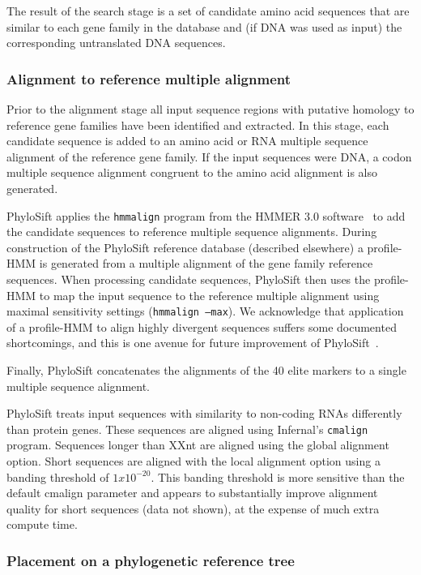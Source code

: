 \documentclass[10pt]{article}
\begin{document}
The result of the search stage is a set of candidate amino acid sequences that are similar to each gene family in the database and (if {DNA} was used as input) the corresponding untranslated {DNA} sequences.

\subsubsection*{Alignment to reference multiple alignment}
Prior to the alignment stage all input sequence regions with putative homology to reference gene families have been identified and extracted.
In this stage, each candidate sequence is added to an amino acid or {RNA} multiple sequence alignment of the reference gene family.
If the input sequences were {DNA}, a codon multiple sequence alignment congruent to the amino acid alignment is also generated.

PhyloSift applies the \texttt{hmmalign} program from the HMMER 3.0 software~\cite{Eddy2011} to add the candidate sequences to reference multiple sequence alignments.
During construction of the PhyloSift reference database (described elsewhere) a profile-HMM is generated from a multiple alignment of the gene family reference sequences.
When processing candidate sequences, PhyloSift then uses the profile-HMM to map the input sequence to the reference multiple alignment using maximal sensitivity settings (\texttt{hmmalign --max}).
We acknowledge that application of a profile-HMM to align highly divergent sequences suffers some documented shortcomings, and this is one avenue for future improvement of PhyloSift~\cite{Loytynoja2012}.

Finally, PhyloSift concatenates the alignments of the 40 elite markers to a single multiple sequence alignment.

PhyloSift treats input sequences with similarity to non-coding {RNA}s differently than protein genes.
These sequences are aligned using Infernal's \texttt{cmalign} program.
Sequences longer than XXnt are aligned using the global alignment option.
Short sequences are aligned with the local alignment option using a banding threshold of $1x10^{-20}$.
This banding threshold is more sensitive than the default cmalign parameter and appears to substantially improve alignment quality for short sequences (data not shown), at the expense of much extra compute time.

\subsubsection*{Placement on a phylogenetic reference tree}
\end{document}

